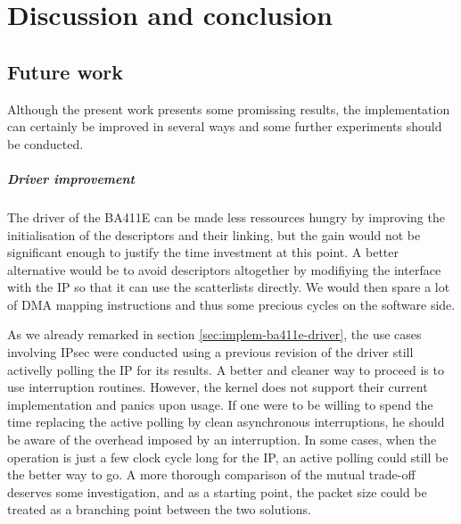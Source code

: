 \chapter{Discussion and conclusion}

\section{Future work}\label{sec:future-work}

Although the present work presents some promissing results, the implementation can certainly be improved in several ways and some further experiments should be conducted.

\paragraph{Driver improvement}
The driver of the BA411E can be made less ressources hungry by improving the initialisation of the descriptors and their linking, but the gain would not be significant enough to justify the time investment at this point.
A better alternative would be to avoid descriptors altogether by modifiying the interface with the IP so that it can use the scatterlists directly.
We would then spare a lot of DMA mapping instructions and thus some precious cycles on the software side.

As we already remarked in section \ref{sec:implem-ba411e-driver}, the use cases involving IPsec were conducted using a previous revision of the driver still activelly polling the IP for its results.
A better and cleaner way to proceed is to use interruption routines.
However, the kernel does not support their current implementation and panics upon usage.
If one were to be willing to spend the time replacing the active polling by clean asynchronous interruptions, he should be aware of the overhead imposed by an interruption.
In some cases, when the operation is just a few clock cycle long for the IP, an active polling could still be the better way to go.
A more thorough comparison of the mutual trade-off deserves some investigation, and as a starting point, the packet size could be treated as a branching point between the two solutions.


